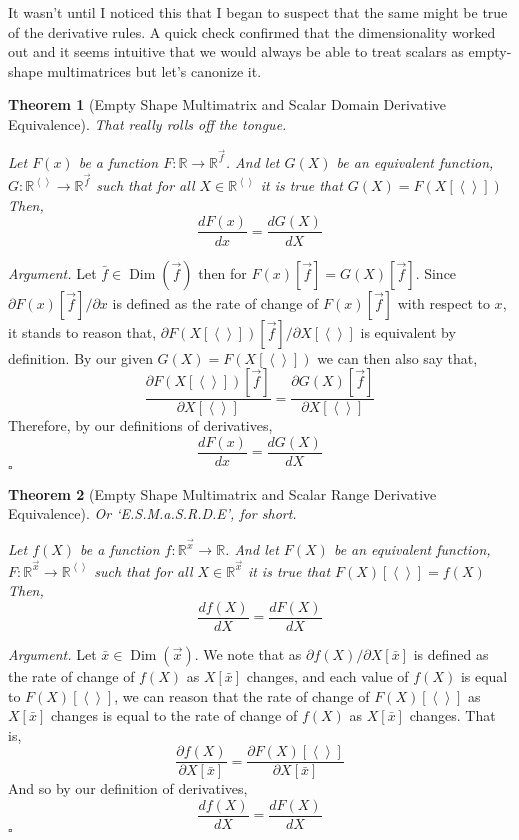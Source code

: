 \documentclass[12pt]{book}
\theoremstyle{plain}
\newtheorem{theorem}{Theorem}[chapter]
\theoremstyle{definition}
\theoremstyle{ppart}
\theoremstyle{case}
\theoremstyle{solution}
\newenvironment{argument}{\noindent\textit{Argument.}}{\hfill$\square$}
\DeclareMathOperator{\Dim}{Dim}
\begin{document}
It wasn't until I noticed this that I began to suspect that the same might be true
of the derivative rules.
A quick check confirmed that the dimensionality worked out and it seems intuitive
that we would always be able to treat scalars
as empty-shape multimatrices but let's canonize it.

\begin{theorem}[Empty Shape Multimatrix and Scalar Domain Derivative Equivalence]
\label{s_mm_domain_equiv}
That really rolls off the tongue.

Let $F(x)$ be a function $F : \mathbb{R} \to \mathbb{R}^{\vec{f}}$. And let
$G(X)$ be an equivalent function,
$G : \mathbb{R}^{\left<\right>} \to \mathbb{R}^{\vec{f}}$
such that for all $X \in \mathbb{R}^{\left<\right>}$ it is true that
$G(X) = F(X[\left<\right>])$
Then,
\[ \frac{dF(x)}{dx} = \frac{dG(X)}{dX} \]
\end{theorem}
\begin{argument}
Let $\bar{f} \in \Dim(\vec{f})$ then for $F(x)[\vec{f}] = G(X)[\vec{f}]$.
Since $\partial F(x)[\vec{f}] / \partial x$ is defined as the rate of
change of $F(x)[\vec{f}]$ with respect to $x$, it stands to reason that,
$\partial F(X[\left<\right>])[\vec{f}] / \partial X[\left<\right>]$ is
equivalent by definition. By our given $G(X) = F(X[\left<\right>])$ we
can then also say that,
\[
\frac{ \partial F(X[\left<\right>])[\vec{f}] }{ \partial X[\left<\right>] }
=
\frac{ \partial G(X)[\vec{f}] }{ \partial X[\left<\right>] }
\]
Therefore, by our definitions of derivatives,
\[
\frac{ d F(x) }{ d x }
=
\frac{ d G(X) }{ d X }
\]
\end{argument}

\begin{theorem}[Empty Shape Multimatrix and Scalar Range Derivative Equivalence]
\label{s_mm_range_equiv} Or `E.S.M.a.S.R.D.E', for short.

Let $f(X)$ be a function $f : \mathbb{R}^{\vec{x}} \to \mathbb{R}$. And let
$F(X)$ be an equivalent function,
$F : \mathbb{R}^{\vec{x}} \to \mathbb{R}^{\left<\right>}$
such that for all $X \in \mathbb{R}^{\vec{x}}$ it is true that
$F(X)[\left<\right>] = f(X)$
Then,
\[ \frac{df(X)}{dX} = \frac{dF(X)}{dX} \]
\end{theorem}
\begin{argument}
Let $\bar{x} \in \Dim(\vec{x})$. We note that as $\partial f(X) / \partial X[\bar{x}]$
is defined as the rate of change of $f(X)$ as $X[\bar{x}]$ changes, and each value of
$f(X)$ is equal to $F(X)[\left<\right>]$, we can reason that the rate of change of
$F(X)[\left<\right>]$ as $X[\bar{x}]$ changes is equal to the rate of change of $f(X)$
as $X[\bar{x}]$ changes. That is,
\[
	\frac{\partial f(X)}{\partial X[\bar{x}]}
		=
	\frac{\partial F(X)[\left<\right>]}{\partial X[\bar{x}]}
\]
And so by our definition of derivatives,
\[ \frac{df(X)}{dX} = \frac{dF(X)}{dX} \]
\end{argument}
\end{document}
